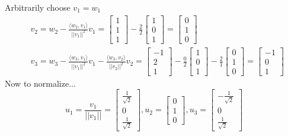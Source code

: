 \documentclass[10pt,letterpaper]{article}
\begin{document}
	Arbitrarily choose $v_1 = w_1$ 
	\begin{align*}
	&v_2 = w_2 - \frac{\langle w_2, v_1 \rangle}{||v_1||^2} v_1 = \begin{bmatrix}
	1 \\ 1 \\ 1
	\end{bmatrix} - \frac{2}{2} \begin{bmatrix}
	1 \\ 0 \\ 1
	\end{bmatrix} = \begin{bmatrix}
	0 \\ 1 \\ 0
	\end{bmatrix} \\
	& v_3 = w_3 - \frac{\langle w_3, v_1 \rangle}{||v_1||^2}v_1 - \frac{\langle w_3, v_2 \rangle}{||v_2||^2}v_2= \begin{bmatrix}
	-1 \\ 2 \\ 1
	\end{bmatrix} - \frac{0}{2} \begin{bmatrix}
	1 \\ 0 \\ 1
	\end{bmatrix} - \frac{2}{1} \begin{bmatrix}
	0 \\ 1 \\ 0
	\end{bmatrix} = \begin{bmatrix}
	-1 \\ 0 \\ 1
	\end{bmatrix}
	\end{align*}
	Now to normalize... 
	$$
	\boxed{u_1 = \frac{v_1}{||v_1||} = \begin{bmatrix}
	\frac{1}{\sqrt{2}} \\ 0 \\ \frac{1}{\sqrt{2}}
	\end{bmatrix}, u_2 = \begin{bmatrix}
	0 \\ 1 \\ 0
	\end{bmatrix}, u_3 = \begin{bmatrix}
	-\frac{1}{\sqrt{2}} \\ 0 \\ \frac{1}{\sqrt{2}}
	\end{bmatrix}}
	$$
\end{document}
